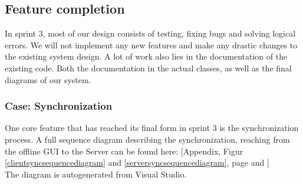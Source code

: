 \subsection{Feature completion}
In sprint 3, most of our design consists of testing, fixing bugs and solving logical errors. We will not implement any new features and make any drastic changes to the existing system design. A lot of work also lies in the documentation of the existing code. Both the documentation in the actual classes, as well as the final diagrams of our system. 
\subsubsection{Case: Synchronization}
One core feature that has reached its final form in sprint 3 is the synchronization process. A full sequence diagram describing the synchronization, reaching from the offline GUI to the Server can be found here:
[Appendix, Figur \ref{clientsyncsequencediagram} and \ref{serversyncsequencediagram}, page \pageref{clientsyncsequencediagram} and \pageref{serversyncsequencediagram}]\\
The diagram is autogenerated from Visual Studio. 